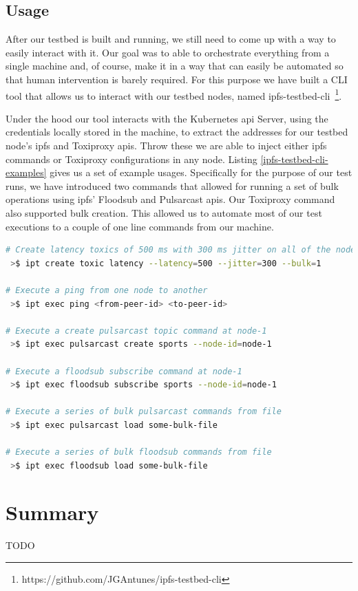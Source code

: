 \subsection{Usage}\label{subsec:testbed-usage}

After our testbed is built and running, we still need to come up with a way to
easily interact with it. Our goal was to able to orchestrate everything from a
single machine and, of course, make it in a way that can easily be automated so
that human intervention is barely required. For this purpose we have built a
CLI tool that allows us to interact with our testbed nodes, named
ipfs-testbed-cli~\footnote{https://github.com/JGAntunes/ipfs-testbed-cli}. 

Under the hood our tool interacts with the Kubernetes \acrshort{api} Server,
using the credentials locally stored in the machine, to extract the addresses
for our testbed node's \acrshort{ipfs} and Toxiproxy \acrshort{api}s. Throw
these we are able to inject either \acrshort{ipfs} commands or Toxiproxy
configurations in any node. Listing \ref{ipfs-testbed-cli-examples} gives us a
set of example usages. Specifically for the purpose of our test runs, we have
introduced two commands that allowed for running a set of bulk operations using
\acrshort{ipfs}' Floodsub and Pulsarcast \acrshort{api}s.  Our Toxiproxy
command also supported bulk creation. This allowed us to automate most of our
test executions to a couple of one line commands from our machine.

\begin{lstlisting}[language=bash, float, caption={\acrshort{ipfs} Testbed CLI example
usages},label={ipfs-testbed-cli-examples}]
# Create latency toxics of 500 ms with 300 ms jitter on all of the nodes (bulk=1)
 >$ ipt create toxic latency --latency=500 --jitter=300 --bulk=1

# Execute a ping from one node to another
 >$ ipt exec ping <from-peer-id> <to-peer-id>

# Execute a create pulsarcast topic command at node-1
 >$ ipt exec pulsarcast create sports --node-id=node-1

# Execute a floodsub subscribe command at node-1
 >$ ipt exec floodsub subscribe sports --node-id=node-1

# Execute a series of bulk pulsarcast commands from file
 >$ ipt exec pulsarcast load some-bulk-file

# Execute a series of bulk floodsub commands from file
 >$ ipt exec floodsub load some-bulk-file

\end{lstlisting}

\section{Summary}\label{summary}

TODO
